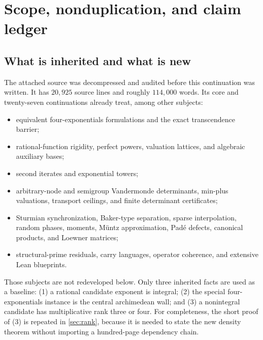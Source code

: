 \documentclass[11pt]{article}
\theoremstyle{definition}
\theoremstyle{remark}
\begin{document}
\begin{abstract}
The conjecture is not proved here.  The report instead isolates a new, exact density gap; gives
self-contained finite-ring counts and reproducible computations; identifies a finite regulator
or reciprocity statement that would bridge the remaining archimedean/local divide; and separates
Lean-friendly algebra from the external Chebotarev, support-theorem, and Subspace-Theorem inputs.
\end{abstract}

\tableofcontents
\newpage

\section{Scope, nonduplication, and claim ledger}

\subsection{What is inherited and what is new}

The attached source was decompressed and audited before this continuation was written.  It has
$20{,}925$ source lines and roughly $114{,}000$ words.  Its core and twenty-seven continuations
already treat, among other subjects:
\begin{itemize}[leftmargin=2em,itemsep=2pt]
\item equivalent four-exponentials formulations and the exact transcendence barrier;
\item rational-function rigidity, perfect powers, valuation lattices, and algebraic auxiliary
      bases;
\item second iterates and exponential towers;
\item arbitrary-node and semigroup Vandermonde determinants, min-plus valuations, transport
      ceilings, and finite determinant certificates;
\item Sturmian synchronization, Baker-type separation, sparse interpolation, random phases,
      moments, M\"untz approximation, Pad\'e defects, canonical products, and Loewner matrices;
\item structural-prime residuals, carry languages, operator coherence, and extensive Lean
      blueprints.
\end{itemize}
Those subjects are not redeveloped below.  Only three inherited facts are used as a baseline:
(1) a rational candidate exponent is integral; (2) the special four-exponentials instance is the
central archimedean wall; and (3) a nonintegral candidate has multiplicative rank three or four.
For completeness, the short proof of (3) is repeated in \cref{sec:rank}, because it is needed to
state the new density theorem without importing a hundred-page dependency chain.
\end{document}
